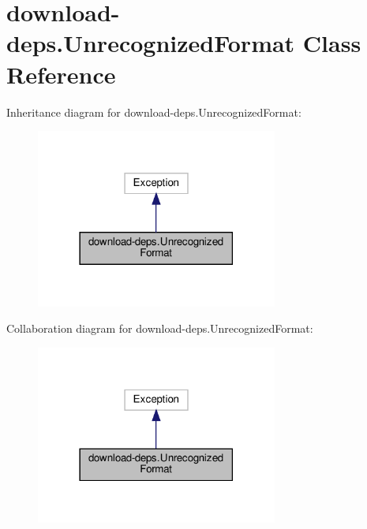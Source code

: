 \hypertarget{classdownload-deps_1_1UnrecognizedFormat}{}\section{download-\/deps.Unrecognized\+Format Class Reference}
\label{classdownload-deps_1_1UnrecognizedFormat}


Inheritance diagram for download-\/deps.Unrecognized\+Format\+:
\nopagebreak
\begin{figure}[H]
\begin{center}
\leavevmode
\includegraphics[width=225pt]{classdownload-deps_1_1UnrecognizedFormat__inherit__graph}
\end{center}
\end{figure}


Collaboration diagram for download-\/deps.Unrecognized\+Format\+:
\nopagebreak
\begin{figure}[H]
\begin{center}
\leavevmode
\includegraphics[width=225pt]{classdownload-deps_1_1UnrecognizedFormat__coll__graph}
\end{center}
\end{figure}
